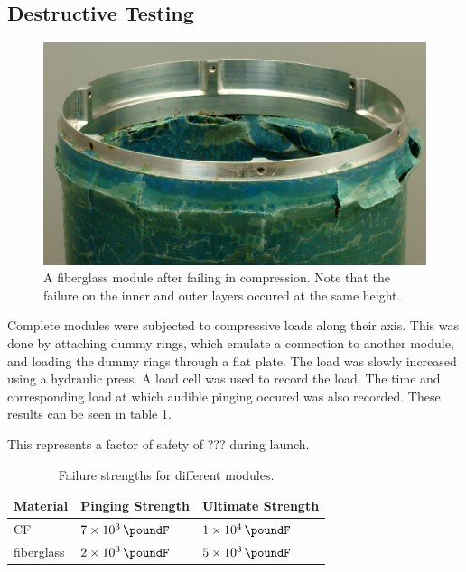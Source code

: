 \documentclass{aiaa-tc}%
\begin{document}
\subsection{Destructive Testing}
\begin{figure}
	\centering
	\includegraphics[width=\linewidth]{../img/FG_fracture.JPG}
	\caption{A fiberglass module after failing in compression. Note that the failure on the inner and outer layers occured at the same height.}
\end{figure}
Complete modules were subjected to compressive loads along their axis. This was done by attaching dummy rings, which emulate a connection to another module, and loading the dummy rings through a flat plate. 
The load was slowly increased using a hydraulic press. 
A load cell was used to record the load. The time and corresponding load at which audible pinging occured was also recorded.
These results can be seen in table \ref{tab:compression}.

This represents a factor of safety of ???
during launch.

\begin{table}
\caption{Failure strengths for different modules.}\label{tab:compression}
\begin{tabular}{lll}
	Material & Pinging Strength & Ultimate Strength\\
	\hline
	CF & $\SI{7e3}{\poundF}$ & $\SI{1e4}{\poundF}$ \\
	fiberglass & $\SI{2e3}{\poundF}$ & $\SI{5e3}{\poundF}$ \\
	
\end{tabular}
\end{table}
\end{document}
